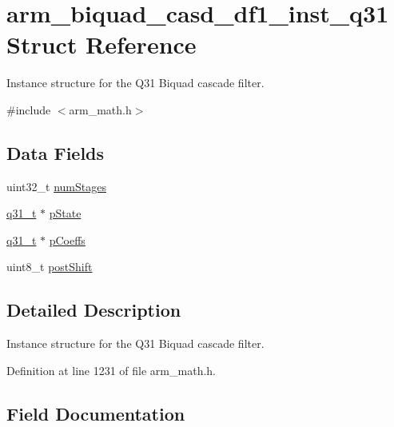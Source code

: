 \hypertarget{structarm__biquad__casd__df1__inst__q31}{}\section{arm\+\_\+biquad\+\_\+casd\+\_\+df1\+\_\+inst\+\_\+q31 Struct Reference}
\label{structarm__biquad__casd__df1__inst__q31}


Instance structure for the Q31 Biquad cascade filter.  




{\ttfamily \#include $<$arm\+\_\+math.\+h$>$}

\subsection*{Data Fields}
\begin{DoxyCompactItemize}
\item 
uint32\+\_\+t \hyperlink{structarm__biquad__casd__df1__inst__q31_aed9c8a6224cd149e8e12b17b25b9b767}{num\+Stages}
\item 
\hyperlink{arm__math_8h_adc89a3547f5324b7b3b95adec3806bc0}{q31\+\_\+t} $\ast$ \hyperlink{structarm__biquad__casd__df1__inst__q31_adee4ba3ee8869865af7d8fa08ca913d6}{p\+State}
\item 
\hyperlink{arm__math_8h_adc89a3547f5324b7b3b95adec3806bc0}{q31\+\_\+t} $\ast$ \hyperlink{structarm__biquad__casd__df1__inst__q31_a68888e36167d81cb7836db10367a1682}{p\+Coeffs}
\item 
uint8\+\_\+t \hyperlink{structarm__biquad__casd__df1__inst__q31_a74050e9f36542bd56f4052381a82ae8f}{post\+Shift}
\end{DoxyCompactItemize}


\subsection{Detailed Description}
Instance structure for the Q31 Biquad cascade filter. 

Definition at line 1231 of file arm\+\_\+math.\+h.



\subsection{Field Documentation}
